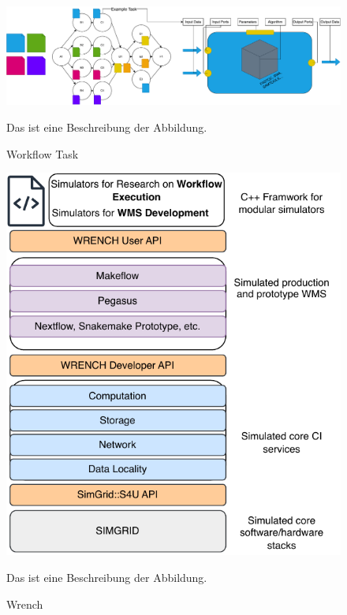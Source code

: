 \begin{figure}[H]
    \centering
    \includegraphics[scale=0.4]{fig/02/02-workflow-task.pdf}
    \caption{Workflow Task}
    \label{fig:02-workflow-task}
    \tiny
    Das ist eine Beschreibung der Abbildung.
\end{figure}

\begin{figure}[H]
    \centering
    \includegraphics[scale=0.7]{fig/02/02-wrench.pdf}
    \caption{Wrench}
    \label{fig:02-wrench}
    \tiny
    Das ist eine Beschreibung der Abbildung.
\end{figure}

